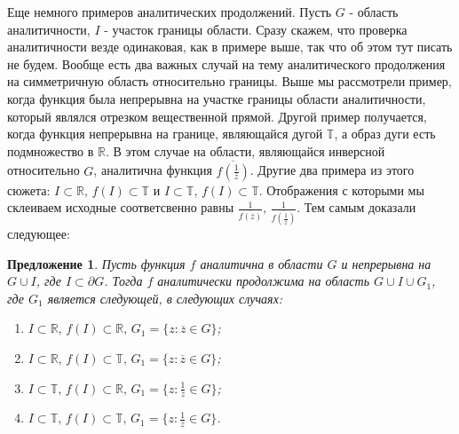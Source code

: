 \documentclass[12pt,a4paper]{article} %
\newtheorem{proposition}{Предложение}
\newcommand{\R}{\mathbb{R}}
\begin{document}
	Еще немного примеров аналитических продолжений. Пусть $G$ - область аналитичности, $I$ - участок границы области. Сразу скажем, что проверка аналитичности везде одинаковая, как в примере выше, так что об этом тут писать не будем. Вообще есть два важных случай на тему аналитического продолжения на симметричную область относительно границы. Выше мы рассмотрели пример, когда функция была непрерывна на участке границы области аналитичности, который являлся отрезком вещественной прямой. Другой пример получается, когда функция непрерывна на границе, являющайся дугой $\mathbb{T}$, а образ дуги есть подмножество в $\R$. В этом случае на области, являющайся инверсной относительно $G$, аналитична функция $\displaystyle\overline{f\left(\frac{1}{\overline{z}}\right)}$. Другие два примера из этого сюжета: $I\subset\R,\,f(I)\subset\mathbb{T}$ и $I\subset\mathbb{T},\,f(I)\subset\mathbb{T}$. Отображения с которыми мы склеиваем исходные соответсвенно равны $\displaystyle\frac{1}{\overline{f(\overline{z})}},\,\frac{1}{\overline{f\left(\displaystyle\frac{1}{\overline{z}}\right)}}$.
	Тем самым доказали следующее:
	\begin{proposition}
		Пусть функция $f$ аналитична в области $G$ и непрерывна на $G\cup I$, где $I\subset\partial G$. Тогда $f$ аналитически продолжима на область $G\cup I\cup G_1$, где $G_1$ является следующей, в следующих случаях:
		\begin{enumerate}
			\item $I\subset\R,\,f(I)\subset\R,\,G_1=\{z:\overline{z}\in G\}$;
			\item $I\subset\R,\,f(I)\subset\mathbb{T},\,G_1=\{z:\overline{z}\in G\}$;
			\item $I\subset\mathbb{T},\,f(I)\subset\R,\,G_1=\{z:\frac{1}{\overline{z}}\in G\}$;
			\item $I\subset\mathbb{T},\,f(I)\subset\mathbb{T},\,G_1=\{z:\frac{1}{\overline{z}}\in G\}$.
		\end{enumerate}
	\end{proposition}
\end{document}
